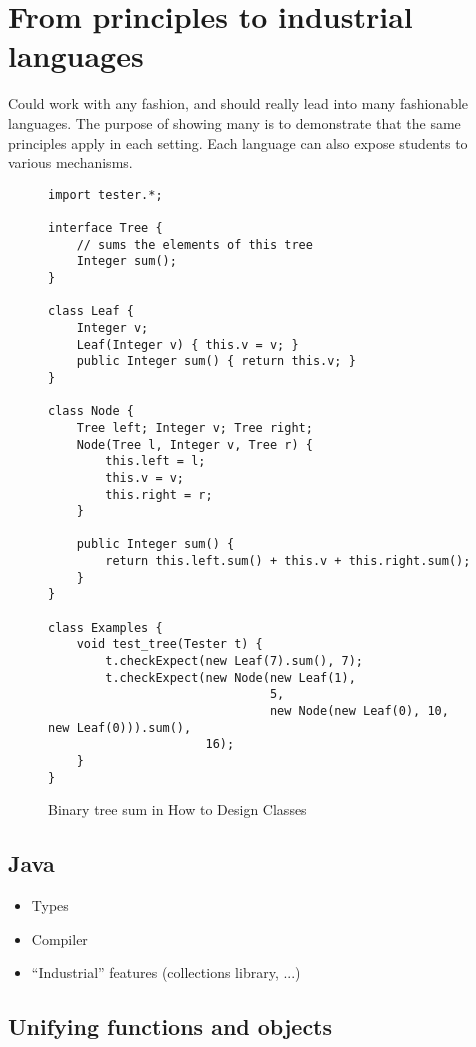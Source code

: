 \documentclass[submission,copyright]{eptcs}
\begin{document}
\section{From principles to industrial languages}
\label{sec:industrial}

Could work with any fashion, and should really lead into many
fashionable languages.  The purpose of showing many is to demonstrate
that the same principles apply in each setting.  Each language can also
expose students to various mechanisms.

\begin{figure}
\begin{verbatim}
import tester.*;

interface Tree {
    // sums the elements of this tree
    Integer sum();
}

class Leaf {
    Integer v;
    Leaf(Integer v) { this.v = v; }
    public Integer sum() { return this.v; }
}

class Node {
    Tree left; Integer v; Tree right;
    Node(Tree l, Integer v, Tree r) {
        this.left = l;
        this.v = v;
        this.right = r;
    }

    public Integer sum() {
        return this.left.sum() + this.v + this.right.sum();
    }
}

class Examples {
    void test_tree(Tester t) {
        t.checkExpect(new Leaf(7).sum(), 7);
        t.checkExpect(new Node(new Leaf(1),
                               5, 
                               new Node(new Leaf(0), 10, new Leaf(0))).sum(),
                      16);
    }
}
\end{verbatim}
\caption{Binary tree sum in How to Design Classes}
\end{figure}


\subsection{Java}

\begin{itemize}
\item Types
\item Compiler
\item ``Industrial'' features (collections library, ...)
\end{itemize}



\subsection{Unifying functions and objects}
\end{document}
